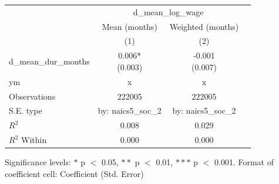 \renewcommand\cellalign{t}
\begin{threeparttable}
\begin{tabular}{lccc}
\toprule
 & \multicolumn{2}{c}{d_mean_log_wage} \\
\cmidrule(lr){2-3} 
 & Mean (months) & Weighted (months) \\
 & (1) & (2) \\
\midrule
\addlinespace
d_mean_dur_months & \makecell{0.006* \\ (0.003)} & \makecell{-0.001 \\ (0.007)} \\
\midrule
\addlinespace
ym & x & x \\
\midrule
\addlinespace
Observations & 222005 & 222005 \\
S.E. type & by: naics5_soc_2 & by: naics5_soc_2 \\
$R^2$ & 0.008 & 0.029 \\
$R^2$ Within & 0.000 & 0.000 \\
\bottomrule
\end{tabular}
\footnotesize Significance levels: $*$ p $<$ 0.05, $**$ p $<$ 0.01, $***$ p $<$ 0.001. Format of coefficient cell: Coefficient 
 (Std. Error)
\end{threeparttable}